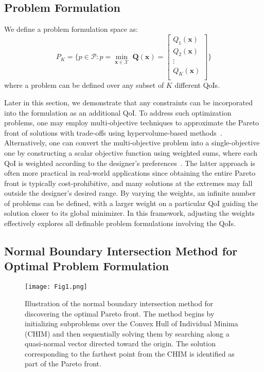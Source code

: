 \documentclass[final,5p,times,twocolumn]{elsarticle}
\begin{document}
\subsection{Problem Formulation}
We define a problem formulation space as:
\begin{equation}
    P_K = \{ p \in \mathcal{P}: p= \min_{\textbf{x}\in \mathcal{X}}\; \mathbf{Q}(\textbf{x}) = 
    \begin{bmatrix}
    Q_1 (\textbf{x})\\
    Q_2 (\textbf{x})\\
    \vdots\\
    Q_K (\textbf{x})\\
    \end{bmatrix}\}
\end{equation}
where a problem can be defined over any subset of $K$ different QoIs.

Later in this section, we demonstrate that any constraints can be incorporated into the formulation as an additional QoI. To address such optimization problems, one may employ multi-objective techniques to approximate the Pareto front of solutions with trade-offs using hypervolume-based methods~\cite{Beume2009S-MetricProblem,Bradstreet2010ACalculations,Emmerich2011Hypervolume-basedComputation,Fonseca2006AnIndicator,Russo2012QuickHypervolume,Yang2007NovelSet,Zitzler1999MultiobjectiveApproach}. Alternatively, one can convert the multi-objective problem into a single-objective one by constructing a scalar objective function using weighted sums, where each QoI is weighted according to the designer's preferences~\cite{Marler2010TheInsights,Kim2005AdaptiveGeneration}. The latter approach is often more practical in real-world applications since obtaining the entire Pareto front is typically cost-prohibitive, and many solutions at the extremes may fall outside the designer’s desired range. By varying the weights, an infinite number of problems can be defined, with a larger weight on a particular QoI guiding the solution closer to its global minimizer. In this framework, adjusting the weights effectively explores all definable problem formulations involving the QoIs.

\subsection{Normal Boundary Intersection Method for Optimal Problem Formulation}

\begin{figure}[htb!]
\centering
\texttt{[image: Fig1.png]}
\caption{Illustration of the normal boundary intersection method for discovering the optimal Pareto front. The method begins by initializing subproblems over the Convex Hull of Individual Minima (CHIM) and then sequentially solving them by searching along a quasi-normal vector directed toward the origin. The solution corresponding to the farthest point from the CHIM is identified as part of the Pareto front.}
\label{case_visual}
\end{figure}
\end{document}
